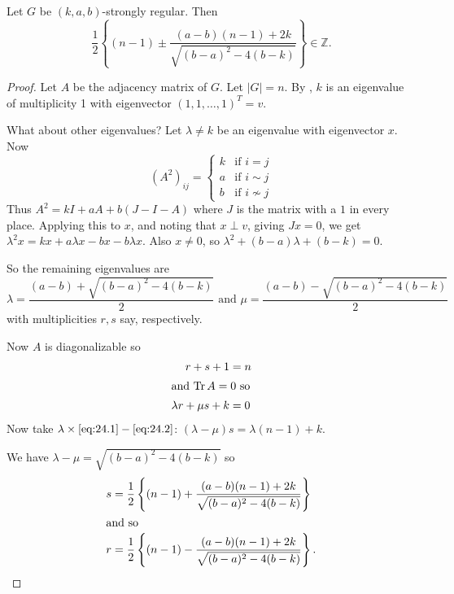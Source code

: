 \documentclass{article}
\DeclareMathOperator{\Tr}{Tr}
\begin{document}
\begin{nthm}\label{thm:47}
    Let $G$ be $(k,a,b)$-strongly regular.
    Then
    \begin{equation*}
        \frac{1}{2} \left\{ (n-1) \pm \frac{(a-b)(n-1) + 2k}{\sqrt{(b-a)^2 - 4(b-k)}}\right\} \in \mathbb{Z}.
    \end{equation*}
\end{nthm}
\begin{proof}
    Let $A$ be the adjacency matrix of $G$.
    Let $|G|=n$.
    By , $k$ is an eigenvalue of multiplicity 1 with eigenvector $(1,1,\dotsc,1)^T = v$.

    What about other eigenvalues?
    Let $\lambda \neq k$ be an eigenvalue with eigenvector $x$. Now
    \begin{equation*}
        (A^2)_{ij} =
        \begin{cases}
            k & \text{if } i = j \\
            a & \text{if } i \sim j \\
            b & \text{if } i \nsim j
        \end{cases}
    \end{equation*}
    Thus $A^2 = k I + aA + b(J-I-A)$ where $J$ is the matrix with a $1$ in every place.
    Applying this to $x$, and noting that $x \perp v$, giving $J x = 0$, we get $\lambda^2 x = k x + a \lambda x - b x - b \lambda x$.
    Also $x \neq 0$, so $\lambda^2 + (b-a) \lambda + (b-k) = 0$.

    So the remaining eigenvalues are
    \begin{equation*}
        \lambda = \frac{(a-b) + \sqrt{(b-a)^2 - 4(b-k)}}{2} \text{ and } \mu = \frac{(a-b) - \sqrt{(b-a)^2 - 4(b-k)}}{2}
    \end{equation*}
    with multiplicities $r,s$ say, respectively.

    Now $A$ is diagonalizable so
    \begin{align}
        r + s + 1 &= n \label{eq:24.1} \\
        \shortintertext{and $\Tr A = 0$ so}
        \lambda r + \mu s + k &= 0 \label{eq:24.2}
    \end{align}
    Now take $\lambda \times \eqref{eq:24.1} - \eqref{eq:24.2}$: $(\lambda - \mu) s = \lambda(n-1) + k$.

    We have $\lambda-\mu = \sqrt{(b-a)^2 - 4(b-k)}$ so
    \begin{align*}
        s &= \frac{1}{2} \left\{ (n-1) + \frac{(a-b)(n-1) + 2k}{\sqrt{(b-a)^2 - 4(b-k)}}\right\} \\
        \shortintertext{and so}
        r &= \frac{1}{2} \left\{ (n-1) - \frac{(a-b)(n-1) + 2k}{\sqrt{(b-a)^2 - 4(b-k)}}\right\}. \qedhere
    \end{align*}
\end{proof}
\end{document}
